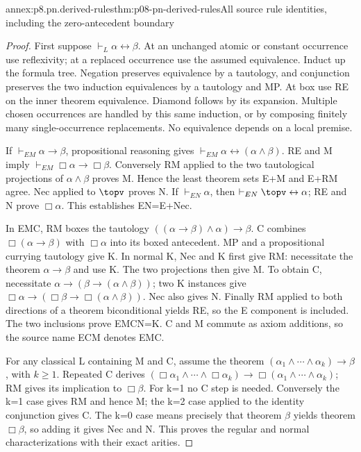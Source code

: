\begin{annexitem}{annex:p8.pn.derived-rules}{thm:p08-pn-derived-rules}{All source rule identities, including the zero-antecedent boundary}
\begin{proof}
First suppose \(\vdash_L\alpha\leftrightarrow\beta\).
At an unchanged atomic or constant occurrence use reflexivity;
at a replaced occurrence use the assumed equivalence. Induct up
the formula tree. Negation preserves equivalence by a tautology,
and conjunction preserves the two induction equivalences by a
tautology and MP. At box use RE on the inner theorem equivalence.
Diamond follows by its expansion. Multiple chosen occurrences
are handled by this same induction, or by composing finitely many
single-occurrence replacements. No equivalence depends on a local premise.

If \(\vdash_{EM}\alpha\to\beta\), propositional reasoning
gives \(\vdash_{EM}\alpha\leftrightarrow(\alpha\land\beta)\).
RE and M imply \(\vdash_{EM}\Box\alpha\to\Box\beta\).
Conversely RM applied to the two tautological projections of
\(\alpha\land\beta\) proves M. Hence the least theorem sets
E+M and E+RM agree. Nec applied to \(\topv\) proves N.
If \(\vdash_{EN}\alpha\), then
\(\vdash_{EN}\topv\leftrightarrow\alpha\); RE and N prove
\(\Box\alpha\). This establishes EN=E+Nec.

In EMC, RM boxes the tautology
\(((\alpha\to\beta)\land\alpha)\to\beta\).
C combines \(\Box(\alpha\to\beta)\) with \(\Box\alpha\)
into its boxed antecedent. MP and a propositional currying
tautology give K. In normal K, Nec and K first give RM: necessitate
the theorem \(\alpha\to\beta\) and use K. The two projections
then give M. To obtain C, necessitate
\(\alpha\to(\beta\to(\alpha\land\beta))\); two K instances
give \(\Box\alpha\to(\Box\beta\to\Box(\alpha\land\beta))\).
Nec also gives N. Finally RM applied to both directions of a
theorem biconditional yields RE, so the E component is included.
The two inclusions prove EMCN=K. C and M commute as axiom additions,
so the source name ECM denotes EMC.

For any classical L containing M and C, assume the theorem
\((\alpha_1\land\cdots\land\alpha_k)\to\beta\), with
\(k\geq1\). Repeated C derives
\((\Box\alpha_1\land\cdots\land\Box\alpha_k)
\to\Box(\alpha_1\land\cdots\land\alpha_k)\);
RM gives its implication to \(\Box\beta\). For k=1 no C
step is needed. Conversely the k=1 case gives RM and hence M;
the k=2 case applied to the identity conjunction gives C.
The k=0 case means precisely that theorem \(\beta\) yields
theorem \(\Box\beta\), so adding it gives Nec and N. This
proves the regular and normal characterizations with their exact arities.


\end{proof}
\end{annexitem}
